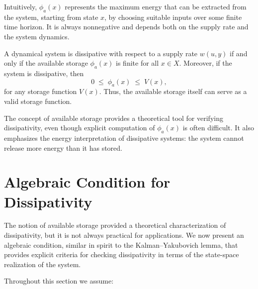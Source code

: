\begin{remark}
Intuitively, $\phi_a(x)$ represents the maximum energy that can be extracted 
from the system, starting from state $x$, by choosing suitable inputs over some finite 
time horizon.  
It is always nonnegative and depends both on the supply rate and the system dynamics.
\end{remark}

\begin{theorem}\label{thm:avail_storage}
A dynamical system is dissipative with respect to a supply rate $w(u,y)$ if and only if 
the available storage $\phi_a(x)$ is finite for all $x \in X$.  
Moreover, if the system is dissipative, then
\[
0 \;\le\; \phi_a(x) \;\le\; V(x),
\]
for any storage function $V(x)$.  
Thus, the available storage itself can serve as a valid storage function.
\end{theorem}

\begin{remark}
The concept of available storage provides a theoretical tool for verifying dissipativity, 
even though explicit computation of $\phi_a(x)$ is often difficult.  
It also emphasizes the energy interpretation of dissipative systems:  
the system cannot release more energy than it has stored.
\end{remark}

\section{Algebraic Condition for Dissipativity}

The notion of available storage provided a theoretical characterization of dissipativity, 
but it is not always practical for applications.  
We now present an algebraic condition, similar in spirit to the Kalman–Yakubovich lemma, 
that provides explicit criteria for checking dissipativity in terms of the state-space 
realization of the system.

Throughout this section we assume:

